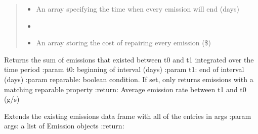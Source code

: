 \documentclass[letterpaper,10pt,english]{sphinxmanual}
\begin{document}
\begin{fulllineitems}
\begin{quote}
\begin{description}
\begin{itemize}
\item {} 
 \textendash{} An array specifying the time when every emission will end (days)

\item {} 
 \textendash{} 

\item {} 
 \textendash{} An array storing the cost of repairing every emission (\$)

\end{itemize}

\end{description}\end{quote}

\begin{fulllineitems}
\label{\detokenize{index:feast.EmissionSimModules.emission_class_functions.Emission.em_rate_in_range}}
Returns the sum of emissions that existed between t0 and t1 integrated over the time period
:param t0: beginning of interval (days)
:param t1: end of interval (days)
:param reparable: boolean condition. If set, only returns emissions with a matching reparable property
:return: Average emission rate between t1 and t0 (g/s)

\end{fulllineitems}


\begin{fulllineitems}
\label{\detokenize{index:feast.EmissionSimModules.emission_class_functions.Emission.extend}}
Extends the existing emissions data frame with all of the entries in args
:param args: a list of Emission objects
:return:

\end{fulllineitems}



\end{fulllineitems}
\end{document}
